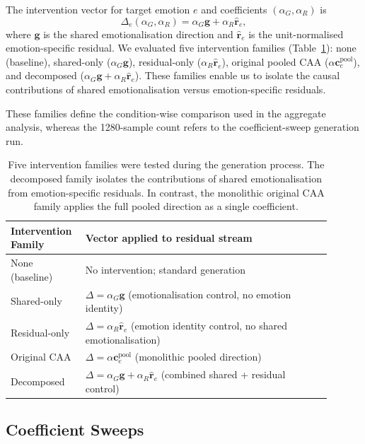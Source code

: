 The intervention vector for target emotion $e$ and coefficients $(\alpha_G, \alpha_R)$ is
\[
\Delta_e(\alpha_G,\alpha_R)=\alpha_G\mathbf{g}+\alpha_R\hat{\mathbf{r}}_e,
\]
where $\mathbf{g}$ is the shared emotionalisation direction and $\hat{\mathbf{r}}_e$ is the unit-normalised emotion-specific residual. We evaluated five intervention families (Table~\ref{tab:steering_conditions}): none (baseline), shared-only ($\alpha_G \mathbf{g}$), residual-only ($\alpha_R \hat{\mathbf{r}}_e$), original pooled CAA ($\alpha \mathbf{c}^{\mathrm{pool}}_e$), and decomposed ($\alpha_G \mathbf{g} + \alpha_R \hat{\mathbf{r}}_e$). These families enable us to isolate the causal contributions of shared emotionalisation versus emotion-specific residuals.

These families define the condition-wise comparison used in the aggregate analysis, whereas the 1280-sample count refers to the coefficient-sweep generation run.

\begin{table}[H]
\centering
\small
\begin{tabular}{p{0.18\linewidth} p{0.72\linewidth}}
\toprule
\textbf{Intervention Family} & \textbf{Vector applied to residual stream} \\
\midrule
None (baseline) & No intervention; standard generation \\
\midrule
Shared-only & $\Delta = \alpha_G \mathbf{g}$ \quad (emotionalisation control, no emotion identity) \\
\midrule
Residual-only & $\Delta = \alpha_R \hat{\mathbf{r}}_e$ \quad (emotion identity control, no shared emotionalisation) \\
\midrule
Original CAA & $\Delta = \alpha \mathbf{c}^{\mathrm{pool}}_e$ \quad (monolithic pooled direction) \\
\midrule
Decomposed & $\Delta = \alpha_G \mathbf{g} + \alpha_R \hat{\mathbf{r}}_e$ \quad (combined shared + residual control) \\
\bottomrule
\end{tabular}
\caption{Five intervention families were tested during the generation process. The decomposed family isolates the contributions of shared emotionalisation from emotion-specific residuals. In contrast, the monolithic original CAA family applies the full pooled direction as a single coefficient.}
\label{tab:steering_conditions}
\end{table}

\subsection*{Coefficient Sweeps}

